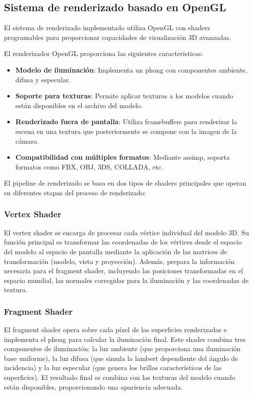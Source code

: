 \subsection{Sistema de renderizado basado en OpenGL}

El sistema de renderizado implementado utiliza OpenGL con shaders programables para proporcionar capacidades de visualización 3D avanzadas.

El renderizador OpenGL proporciona las siguientes características:

\begin{itemize}
    \item \textbf{Modelo de iluminación}: Implementa un \gls{phong} con componentes ambiente, difusa y especular.
    \item \textbf{Soporte para texturas}: Permite aplicar texturas a los modelos cuando están disponibles en el archivo del modelo.
    \item \textbf{Renderizado fuera de pantalla}: Utiliza framebuffers para renderizar la escena en una textura que posteriormente se compone con la imagen de la cámara.
    \item \textbf{Compatibilidad con múltiples formatos}: Mediante \acrshort{assimp}, soporta formatos como FBX, OBJ, 3DS, COLLADA, etc.
\end{itemize}

El pipeline de renderizado se basa en dos tipos de shaders principales que operan en diferentes etapas del proceso de renderizado:

\subsubsection{Vertex Shader}
El vertex shader se encarga de procesar cada vértice individual del modelo 3D. Su función principal es transformar las coordenadas de los vértices desde el espacio del modelo al espacio de pantalla mediante la aplicación de las matrices de transformación (modelo, vista y proyección). Además, prepara la información necesaria para el fragment shader, incluyendo las posiciones transformadas en el espacio mundial, las normales corregidas para la iluminación y las coordenadas de textura.

\subsubsection{Fragment Shader}
El fragment shader opera sobre cada píxel de las superficies renderizadas e implementa el \gls{phong} para calcular la iluminación final. Este shader combina tres componentes de iluminación: la luz ambiente (que proporciona una iluminación base uniforme), la luz difusa (que simula la \gls{lambert} dependiente del ángulo de incidencia) y la luz especular (que genera los brillos característicos de las superficies). El resultado final se combina con las texturas del modelo cuando están disponibles, proporcionando una apariencia adecuada.

